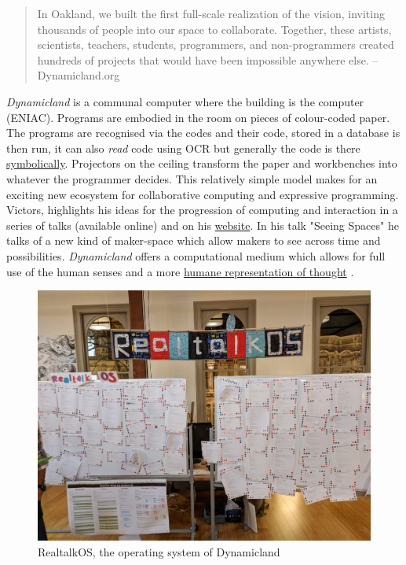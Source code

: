 \documentclass[12pt]{report}
\begin{document}
\begin{quote}


In Oakland, we built the first full-scale realization of the vision, inviting
thousands of people into our space to collaborate. Together, these artists,
scientists, teachers, students, programmers, and non-programmers created
hundreds of projects that would have been impossible anywhere else.
-- Dynamicland.org 
\end{quote}


\emph{Dynamicland} is a communal computer where the building is the computer (ENIAC).
Programs are embodied in the room on pieces of colour-coded paper. The programs
are recognised via the codes and their code, stored in a database is then run,
it can also \emph{read} code using OCR but generally the code is there \href{https://thenewstack.io/dynamicland-rethinks-computer-interfaces/}{symbolically}.
Projectors on the ceiling transform the paper and workbenches into whatever the
programmer decides. This relatively simple model makes for an exciting new
ecosystem for collaborative computing and expressive programming. Victors,
highlights his ideas for the progression of computing and interaction in a
series of talks (available online) and on his \href{http://worrydream.com}{website}. In his talk "Seeing
Spaces" he talks of a new kind of maker-space which allow makers to see across
time and possibilities. \emph{Dynamicland} offers a computational medium which allows
for full use of the human senses and a more \href{https://vimeo.com/115154289}{humane representation of thought}
\cite{VictorKayDynamicLand}. \\

\begin{figure}[htbp]
\centering
\includegraphics[width=12cm]{assets/realtalk-os.jpg}
\caption{RealtalkOS, the operating system of Dynamicland}
\end{figure}  
\end{document}
